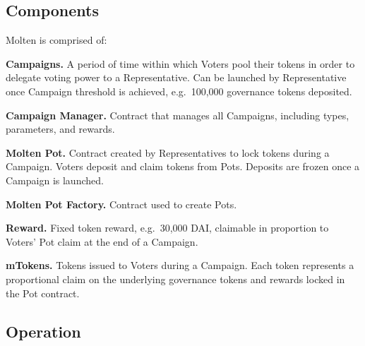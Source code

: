 \documentclass[
]{article}
\begin{document}
\hypertarget{components}{%
\subsection{Components}\label{components}}

Molten is comprised of:

\textbf{Campaigns.} A period of time within which Voters pool their
tokens in order to delegate voting power to a Representative. Can be
launched by Representative once Campaign threshold is achieved,
e.g.~100,000 governance tokens deposited.

\textbf{Campaign Manager.} Contract that manages all Campaigns,
including types, parameters, and rewards.

\textbf{Molten Pot.} Contract created by Representatives to lock tokens
during a Campaign. Voters deposit and claim tokens from Pots. Deposits
are frozen once a Campaign is launched.

\textbf{Molten Pot Factory.} Contract used to create Pots.

\textbf{Reward.} Fixed token reward, e.g.~30,000 DAI, claimable in
proportion to Voters' Pot claim at the end of a Campaign.

\textbf{mTokens.} Tokens issued to Voters during a Campaign. Each token
represents a proportional claim on the underlying governance tokens and
rewards locked in the Pot contract.

\hypertarget{operation}{%
\subsection{Operation}\label{operation}}
\end{document}

